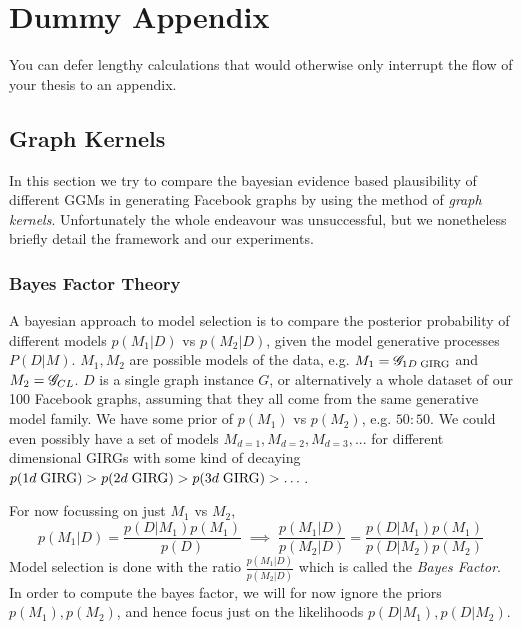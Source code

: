 \chapter{Dummy Appendix}
\minitoc
You can defer lengthy calculations that would otherwise only interrupt
the flow of your thesis to an appendix.


\section{Graph Kernels}
\label{chap:graph_kernels}

In this section we try to compare the bayesian evidence based plausibility of different GGMs in generating Facebook graphs by using the method of \textit{graph kernels}. Unfortunately the whole endeavour was unsuccessful, but we nonetheless briefly detail the framework and our experiments.

\subsection{Bayes Factor Theory}
A bayesian approach to model selection is to compare the posterior probability of different models $p(M_1 | D)$ vs $p(M_2 | D)$, given the model generative processes $P(D | M)$. 
$M_1, M_2$ are possible models of the data, e.g. $M_1 = \mathscr{G}_{1D\; \mathrm{GIRG}}$ and $M_2 = \mathscr{G}_{CL}$.
$D$ is a single graph instance $G$, or alternatively a whole dataset of our 100 Facebook graphs, assuming that they all come from the same generative model family.
We have some prior of $p(M_1)$ vs $p(M_2)$, e.g. $50 : 50$. We could even possibly have a set of models $M_{d=1}, M_{d=2}, M_{d=3}, ...$ for different dimensional GIRGs with some kind of decaying $p(1d\; \mathrm{GIRG}) > p(2d\; \mathrm{GIRG}) > p(3d\; \mathrm{GIRG}) > \dots$.

For now focussing on just $M_1$ vs $M_2$,
\begin{equation}
  p(M_1 | D) = \frac{p(D | M_1) p(M_1)}{p(D)} 
  \;
  \implies
  \;
  \frac{p(M_1 | D)}{p(M_2 | D)} = \frac{p(D | M_1) p(M_1)}{p(D | M_2) p(M_2)}
\end{equation}
Model selection is done with the ratio $\frac{p(M_1 | D)}{p(M_2 | D)}$ which is called the \textit{Bayes Factor}.
In order to compute the bayes factor, we will for now ignore the priors $p(M_1), p(M_2)$, and hence focus just on the likelihoods $p(D | M_1), p(D | M_2)$.



